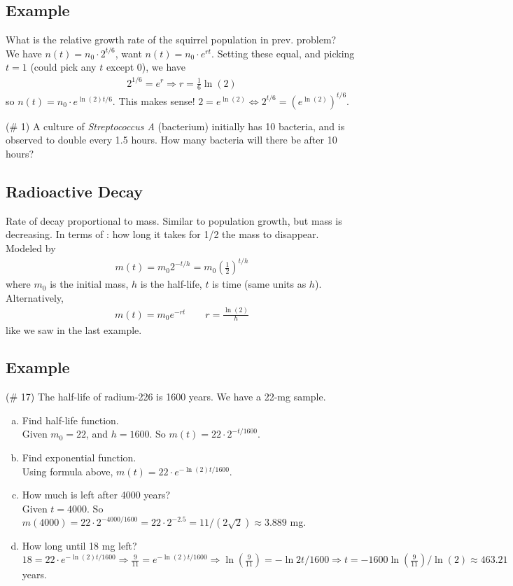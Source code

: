 \documentclass{tufte-handout}
\begin{document}
\subsection{Example}
What is the relative growth rate of the squirrel population in prev. problem? \\

{\color{blue} We have $n(t) = n_0 \cdot 2^{t/6}$, want $n(t) = n_0 \cdot e^{rt}$. Setting these equal, and picking $t = 1$ (could pick any $t$ except 0), we have
\begin{align*}
2^{1/6} = e^r \Rightarrow r = \frac{1}{6}\ln(2)
\end{align*}
so $n(t) = n_0 \cdot e^{\ln(2)t/6}$.
This makes sense! $2 = e^{\ln(2)} \Leftrightarrow 2^{t/6} = \left( e^{\ln(2)} \right)^{t/6}$.}

(\# 1) A culture of \textit{Streptococcus A} (bacterium) initially has 10 bacteria, and is observed to double every 1.5 hours. How many bacteria will there be after 10 hours?\\

\subsection{Radioactive Decay}
Rate of decay proportional to mass.
Similar to population growth, but mass is decreasing.
In terms of : how long it takes for 1/2 the mass to disappear.
Modeled by
\begin{align*}
m(t) = m_0 2^{-t/h} = m_0 \left(\frac{1}{2} \right)^{t/h}
\end{align*}
where $m_0$ is the initial mass, $h$ is the half-life, $t$ is time (same units as $h$).
Alternatively,
\begin{align*}
m(t) = m_0 e^{-rt} \qquad r = \frac{\ln(2)}{h}
\end{align*}
like we saw in the last example.

\subsection{Example}
(\# 17) The half-life of radium-226 is 1600 years. We have a 22-mg sample.
\begin{enumerate}[(a)]
\item Find half-life function.\\
{\color{blue} Given $m_0 = 22$, and $h = 1600$. So $m(t) = 22 \cdot 2^{-t/1600}$.}
\item Find exponential function.\\
{\color{blue} Using formula above, $m(t) = 22 \cdot e^{-\ln(2)t/1600}$.}
\item How much is left after 4000 years?\\
{\color{blue} Given $t = 4000$. So $m(4000) = 22 \cdot 2^{-4000/1600} = 22 \cdot 2^{-2.5} =  11/(2\sqrt{2}) \approx 3.889$ mg.}
\item How long until 18 mg left?\\
{\color{blue} $18 = 22 \cdot e^{-\ln(2)t/1600} \Rightarrow \frac{9}{11} = e^{-\ln(2)t/1600} \Rightarrow \ln\left( \frac{9}{11} \right) = -\ln{2}t/1600 \Rightarrow
t = -1600\ln\left( \frac{9}{11} \right)/\ln(2) \approx 463.21$ years.}
\end{enumerate}
\end{document}
